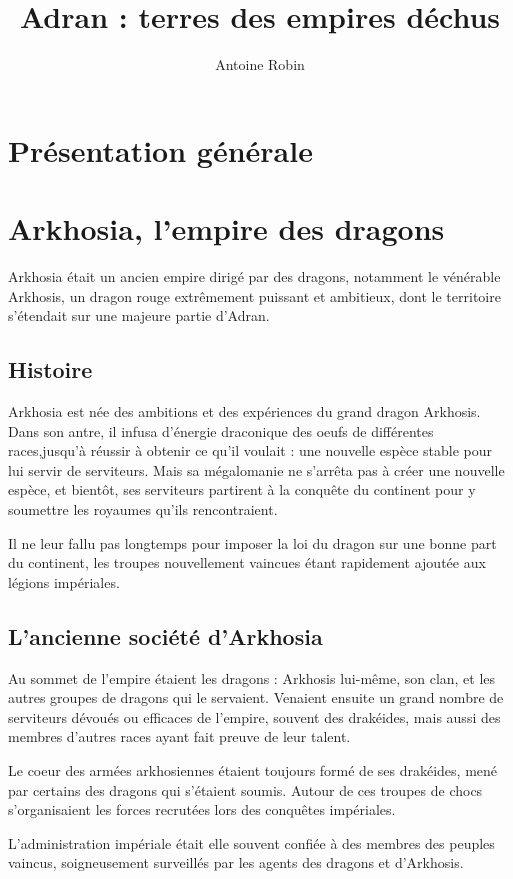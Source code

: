 \documentclass[10pt,a4paper]{book}
\author{ Antoine Robin}
\title{Adran : terres des empires déchus}
\begin{document}
\maketitle
\tableofcontents
\chapter{Présentation générale}
\chapter{Arkhosia, l'empire des dragons}
Arkhosia était un ancien empire dirigé par des dragons, notamment le vénérable Arkhosis, un dragon rouge extrêmement puissant et ambitieux, dont le territoire s'étendait sur une majeure partie d'Adran. 
\section{Histoire}
Arkhosia est née des ambitions et des expériences du grand dragon Arkhosis. Dans son antre, il infusa d'énergie draconique des oeufs de différentes races,jusqu'à réussir à obtenir ce qu'il voulait : une nouvelle espèce stable pour lui servir de serviteurs. Mais sa mégalomanie ne s'arrêta pas à créer une nouvelle espèce, et bientôt, ses serviteurs partirent à la conquête du continent pour y soumettre les royaumes qu'ils rencontraient.

Il ne leur fallu pas longtemps pour imposer la loi du dragon sur une bonne part du continent, les troupes nouvellement vaincues étant rapidement ajoutée aux légions impériales.


\section{L'ancienne société d'Arkhosia}
Au sommet de l'empire étaient les dragons : Arkhosis lui-même, son clan, et les autres groupes de dragons qui le servaient. Venaient ensuite un grand nombre de serviteurs dévoués ou efficaces de l'empire, souvent des drakéides, mais aussi des membres d'autres races ayant fait preuve de leur talent.

Le coeur des armées arkhosiennes étaient toujours formé de ses drakéides, mené par certains des dragons qui s'étaient soumis. Autour de ces troupes de chocs s'organisaient les forces recrutées lors des conquêtes impériales.

L'administration impériale était elle souvent confiée à des membres des peuples vaincus, soigneusement surveillés par les agents des dragons et d'Arkhosis.
\end{document}
